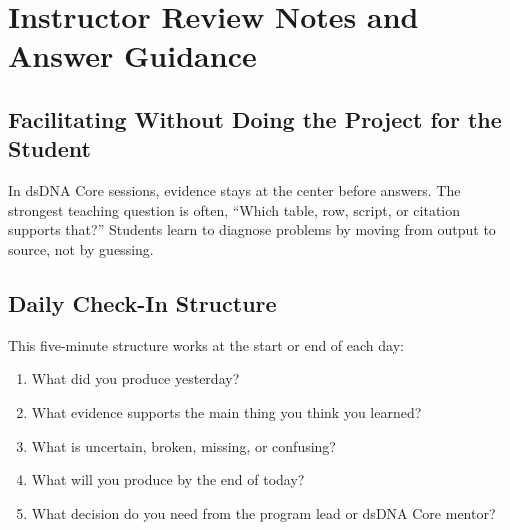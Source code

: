 \chapter{Instructor Review Notes and Answer Guidance}

\section{Facilitating Without Doing the Project for the Student}
In dsDNA Core sessions, evidence stays at the center before answers. The strongest teaching question is often, ``Which table, row, script, or citation supports that?'' Students learn to diagnose problems by moving from output to source, not by guessing.

\section{Daily Check-In Structure}
This five-minute structure works at the start or end of each day:
\begin{enumerate}
  \item What did you produce yesterday?
  \item What evidence supports the main thing you think you learned?
  \item What is uncertain, broken, missing, or confusing?
  \item What will you produce by the end of today?
  \item What decision do you need from the program lead or dsDNA Core mentor?
\end{enumerate}


